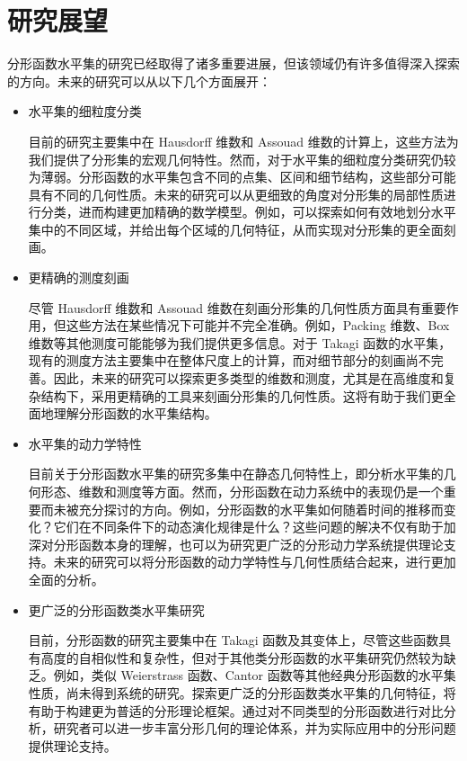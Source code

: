 \section{研究展望}
分形函数水平集的研究已经取得了诸多重要进展，但该领域仍有许多值得深入探索的方向。未来的研究可以从以下几个方面展开：
\begin{itemize}

\item 水平集的细粒度分类

目前的研究主要集中在 Hausdorff 维数和 Assouad 维数的计算上，这些方法为我们提供了分形集的宏观几何特性。然而，对于水平集的细粒度分类研究仍较为薄弱。分形函数的水平集包含不同的点集、区间和细节结构，这些部分可能具有不同的几何性质。未来的研究可以从更细致的角度对分形集的局部性质进行分类，进而构建更加精确的数学模型。例如，可以探索如何有效地划分水平集中的不同区域，并给出每个区域的几何特征，从而实现对分形集的更全面刻画。

\item 更精确的测度刻画

尽管 Hausdorff 维数和 Assouad 维数在刻画分形集的几何性质方面具有重要作用，但这些方法在某些情况下可能并不完全准确。例如，Packing 维数、Box 维数等其他测度可能能够为我们提供更多信息。对于 Takagi 函数的水平集，现有的测度方法主要集中在整体尺度上的计算，而对细节部分的刻画尚不完善。因此，未来的研究可以探索更多类型的维数和测度，尤其是在高维度和复杂结构下，采用更精确的工具来刻画分形集的几何性质。这将有助于我们更全面地理解分形函数的水平集结构。

\item 水平集的动力学特性

目前关于分形函数水平集的研究多集中在静态几何特性上，即分析水平集的几何形态、维数和测度等方面。然而，分形函数在动力系统中的表现仍是一个重要而未被充分探讨的方向。例如，分形函数的水平集如何随着时间的推移而变化？它们在不同条件下的动态演化规律是什么？这些问题的解决不仅有助于加深对分形函数本身的理解，也可以为研究更广泛的分形动力学系统提供理论支持。未来的研究可以将分形函数的动力学特性与几何性质结合起来，进行更加全面的分析。

\item 更广泛的分形函数类水平集研究

目前，分形函数的研究主要集中在 Takagi 函数及其变体上，尽管这些函数具有高度的自相似性和复杂性，但对于其他类分形函数的水平集研究仍然较为缺乏。例如，类似 Weierstrass 函数、Cantor 函数等其他经典分形函数的水平集性质，尚未得到系统的研究。探索更广泛的分形函数类水平集的几何特征，将有助于构建更为普适的分形理论框架。通过对不同类型的分形函数进行对比分析，研究者可以进一步丰富分形几何的理论体系，并为实际应用中的分形问题提供理论支持。


\end{itemize}
